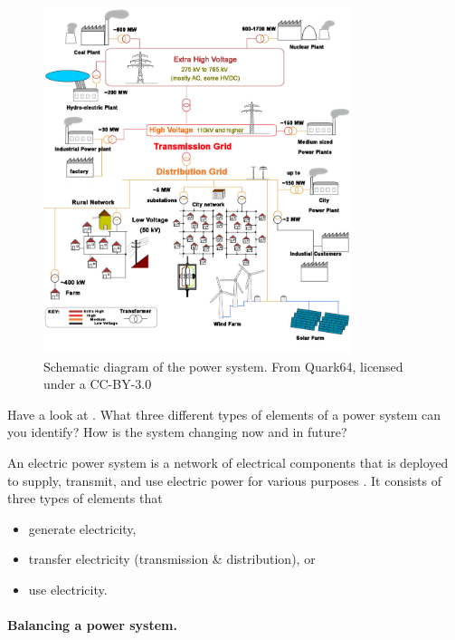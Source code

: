 \begin{figure}[hb]
	\includegraphics[width=0.8\textwidth]{files/power_system.jpg}
	\caption[Schematic diagram of the power system.]{Schematic diagram of the power system. From Quark64, licensed under a CC-BY-3.0}
\end{figure}

\begin{kaobox}[frametitle=Task]
Have a look at . What three different types of elements of a power system can you identify? How is the system changing now and in future?
\end{kaobox}


\begin{definition}
An electric power system is a network of electrical components that is deployed to supply, transmit, and use electric power for various purposes . It consists of three types of elements that
\begin{itemize}
\item generate electricity,
\item transfer electricity (transmission \& distribution), or
\item use electricity.
\end{itemize} 
\end{definition}



\paragraph*{Balancing a power system.}


